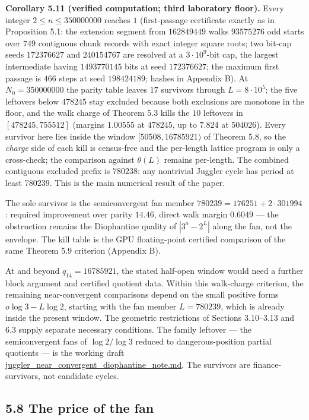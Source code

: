 \documentclass[12pt]{article}
\begin{document}
\textbf{Corollary 5.11 (verified computation; third laboratory floor).}
Every integer \(2\le n\le 350000000\) reaches \(1\) (first-passage
certificate exactly as in Proposition 5.1: the extension segment from
\(162849449\) walks \(93575276\) odd starts over \(749\) contiguous
chunk records with exact integer square roots; two bit-cap seeds
\(172376627\) and \(240154767\) are resolved at a \(3\cdot 10^9\)-bit
cap, the largest intermediate having \(1493770145\) bits at seed
\(172376627\); the maximum first passage is \(466\) steps at seed
\(198424189\); hashes in Appendix B). At \(N_0=350000000\) the parity
table leaves \(17\) survivors through \(L=8\cdot 10^5\); the five
leftovers below \(478245\) stay excluded because both exclusions are
monotone in the floor, and the walk charge of Theorem 5.3 kills the
\(10\) leftovers in \([478245,755512]\) (margins \(1.00555\) at
\(478245\), up to \(7.824\) at \(504026\)). Every survivor here lies
inside the window \([50508,16785921)\) of Theorem 5.8, so the
\emph{charge} side of each kill is census-free and the per-length
lattice program is only a cross-check; the comparison against
\(\theta(L)\) remains per-length. The combined contiguous excluded
prefix is \(780238\): any nontrivial Juggler cycle has period at least
\(780239\). This is the main numerical result of the paper.

The sole survivor is the semiconvergent fan member
\(780239=176251+2\cdot 301994\): required improvement over parity
\(14.46\), direct walk margin \(0.6049\) --- the obstruction remains the
Diophantine quality of \(|3^o-2^L|\) along the fan, not the envelope.
The kill table is the GPU floating-point certified comparison of the
same Theorem 5.9 criterion (Appendix B).

At and beyond \(q_{14}=16785921\), the stated half-open window would
need a further block argument and certified quotient data. Within this
walk-charge criterion, the remaining near-convergent comparisons depend
on the small positive forms \(o\log3-L\log2\), starting with the fan
member \(L=780239\), which is already inside the present window. The
geometric restrictions of Sections 3.10--3.13 and 6.3 supply separate
necessary conditions. The family leftover --- the semiconvergent fans of
\(\log 2/\log 3\) reduced to dangerous-position partial quotients --- is
the working draft \url{juggler_near_convergent_diophantine_note.md}. The
survivors are finance-survivors, not candidate cycles.

\subsection{5.8 The price of the fan}\label{the-price-of-the-fan}
\end{document}
